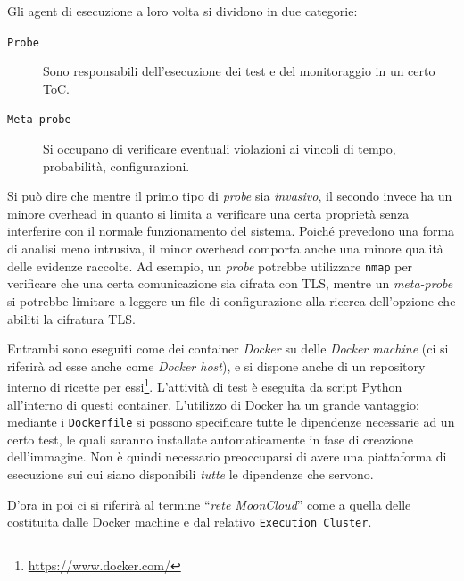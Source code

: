 Gli agent di esecuzione a loro volta si dividono in due categorie:
\begin{description}
	\item[\texttt{Probe}]Sono responsabili dell'esecuzione dei test e del
	monitoraggio in un certo ToC.
	\item[\texttt{Meta-probe}]Si occupano di verificare eventuali violazioni ai
	vincoli di tempo, probabilità, configurazioni. 
\end{description}
Si può dire che mentre il primo tipo di \textit{probe} sia \textit{invasivo}, il secondo invece
ha un minore overhead in quanto si limita a verificare una certa proprietà
senza interferire con il normale funzionamento del sistema.
Poiché prevedono una forma di analisi meno intrusiva, il minor overhead comporta
anche una minore qualità delle evidenze raccolte.
Ad esempio, un \textit{probe} potrebbe utilizzare \texttt{nmap} per verificare che
una certa comunicazione sia cifrata con TLS, mentre un \textit{meta-probe} si
potrebbe limitare a leggere un file di configurazione alla ricerca dell'opzione
che abiliti la cifratura TLS.

Entrambi sono eseguiti come dei container \textit{Docker} su delle \textit{Docker machine}
(ci si riferirà ad esse anche come \textit{Docker host}),
e si dispone anche di un repository interno di ricette per essi\footnote{\url{https://www.docker.com/}}.
L'attività di test è eseguita da script Python all'interno di questi container.
L'utilizzo di Docker ha un grande vantaggio: mediante i \texttt{Dockerfile} si possono
specificare tutte le dipendenze necessarie ad un certo test, le quali saranno
installate automaticamente in fase di creazione dell'immagine. Non è quindi necessario
preoccuparsi di avere una piattaforma di esecuzione sui cui siano disponibili \textit{tutte}
le dipendenze che servono.

D'ora in poi ci si riferirà al termine ``\textit{rete MoonCloud}'' come a quella
delle costituita dalle Docker machine e dal relativo \texttt{Execution Cluster}.